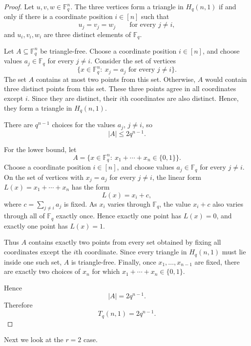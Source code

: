 \documentclass[11pt]{article}
\theoremstyle{plain}
\newcommand{\F}{\mathbb{F}}
\begin{document}
\begin{proof}
Let $u,v,w\in\F_q^n$.  
The three vertices form a triangle in
$H_q(n,1)$ if and only if there is a coordinate position $i\in[n]$ such
that
\[
u_j=v_j=w_j \qquad\text{for every } j\ne i,
\]
and $u_i,v_i,w_i$ are three distinct elements of $\F_q$.

Let $A\subseteq\F_q^n$ be triangle-free.  
Choose a coordinate position $i\in[n]$, and choose values $a_j\in\F_q$ for every $j\ne i$.
Consider the set of vertices
\[
\{x\in\F_q^n:\ x_j=a_j \text{ for every } j\ne i\}.
\]
The set $A$ contains at most two points from this set.  
Otherwise, $A$ would contain three distinct points from this set.
These three points agree in all coordinates except $i$.
Since they are distinct, their $i$th coordinates are also distinct.
Hence, they form a triangle in $H_q(n,1)$.

There are $q^{n-1}$ choices for the values $a_j$, $j\ne i$, so
\[
|A|\le 2q^{n-1}.
\]

For the lower bound, let
\[
A=\{x\in\F_q^n:\ x_1+\cdots+x_n\in\{0,1\}\}.
\]
Choose a coordinate position $i\in[n]$, and choose values $a_j\in\F_q$
for every $j\ne i$.  On the set of vertices with $x_j=a_j$ for every
$j\ne i$, the linear form $L(x)=x_1+\cdots+x_n$ has the form
\[
L(x)=x_i+c,
\]
where $c=\sum_{j\ne i}a_j$ is fixed.  As $x_i$ varies through $\F_q$,
the value $x_i+c$ also varies through all of $\F_q$ exactly once.
Hence exactly one point has $L(x)=0$, and exactly one point has
$L(x)=1$.

Thus $A$ contains exactly two points from every set obtained by fixing
all coordinates except the $i$th coordinate.  Since every triangle in
$H_q(n,1)$ must lie inside one such set, $A$ is triangle-free.
Finally, once $x_1,\ldots,x_{n-1}$ are fixed, there are exactly two
choices of $x_n$ for which $x_1+\cdots+x_n\in\{0,1\}$.

Hence
\[
|A|=2q^{n-1}.
\]
Therefore
\[
T_q(n,1)=2q^{n-1}.
\]
\end{proof}

Next we look at the $r=2$ case.
\end{document}
